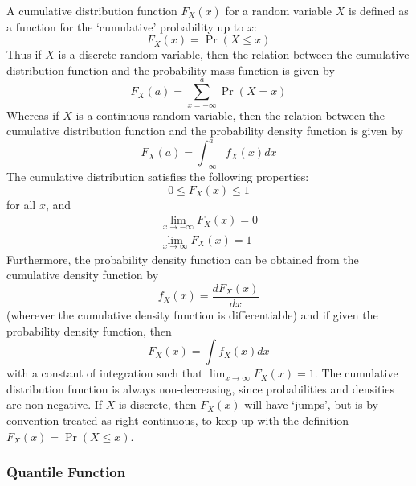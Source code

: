 \documentclass[11pt]{report} %
\begin{document}
A cumulative distribution function $F_{X}\left(x\right)$ for a random variable $X$ is defined as a function for the `cumulative' probability up to $x$:
\begin{equation}
F_{X}\left(x\right) = \operatorname{Pr}\left(X \leq x\right)
\end{equation}
Thus if $X$ is a discrete random variable, then the relation between the cumulative distribution function and the probability mass function is given by
\begin{equation}
F_{X}\left(a\right) = \sum_{x = -\infty}^{a}\operatorname{Pr}\left(X = x\right)
\end{equation}
Whereas if $X$ is a continuous random variable, then the relation between the cumulative distribution function and the probability density function is given by
\begin{equation}
F_{X}\left(a\right) = \int_{-\infty}^{a}f_{X}\left(x\right)dx
\end{equation}
The cumulative distribution satisfies the following properties:
\begin{equation}
0 \leq F_{X}\left(x\right) \leq 1
\end{equation}
for all $x$, and
\begin{gather}
\lim_{x\to -\infty}F_{X}\left(x\right) = 0 \\
\lim_{x\to \infty}F_{X}\left(x\right) = 1
\end{gather}
Furthermore, the probability density function can be obtained from the cumulative density function by
\begin{equation}
f_{X}\left(x\right) = \dfrac{dF_{X}\left(x\right)}{dx}
\end{equation}
(wherever the cumulative density function is differentiable) and if given the probability density function, then
\begin{equation}
F_{X}\left(x\right) = \int f_{X}\left(x\right)dx
\end{equation}
with a constant of integration such that $\lim_{x\to \infty}F_{X}\left(x\right) = 1$. The cumulative distribution function is always non-decreasing, since probabilities and densities are non-negative. If $X$ is discrete, then $F_{X}\left(x\right)$ will have `jumps', but is by convention treated as right-continuous, to keep up with the definition $F_{X}\left(x\right) = \operatorname{Pr}\left(X \leq x\right)$.

\subsubsection{Quantile Function}
\end{document}
